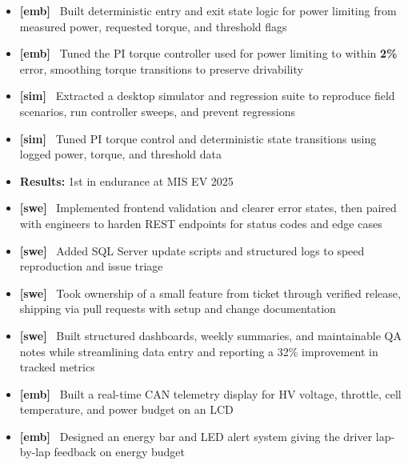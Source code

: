 \documentclass[10pt,letterpaper]{article}
\newcommand{\vtag}[1]{\textbf{[#1]}~}
\begin{document}
\entryspace

\orgline{\spartanracing}
\begin{itemize}
  \item \vtag{emb} Built deterministic entry and exit state logic for power limiting from measured power, requested torque, and threshold flags
  \item \vtag{emb} Tuned the PI torque controller used for power limiting to within \textbf{2\%} error, smoothing torque transitions to preserve drivability
  \item \vtag{sim} Extracted a desktop simulator and regression suite to reproduce field scenarios, run controller sweeps, and prevent regressions
  \item \vtag{sim} Tuned PI torque control and deterministic state transitions using logged power, torque, and threshold data
  \item \textbf{Results:} 1st in endurance at MIS EV 2025
\end{itemize}

\entryspace

\begin{itemize}
  \item \vtag{swe} Implemented frontend validation and clearer error states, then paired with engineers to harden REST endpoints for status codes and edge cases
  \item \vtag{swe} Added SQL Server update scripts and structured logs to speed reproduction and issue triage
  \item \vtag{swe} Took ownership of a small feature from ticket through verified release, shipping via pull requests with setup and change documentation
\end{itemize}

\entryspace

\begin{itemize}
  \item \vtag{swe} Built structured dashboards, weekly summaries, and maintainable QA notes while streamlining data entry and reporting a 32\% improvement in tracked metrics
\end{itemize}


\orgline{\spartanracing}
\begin{itemize}
  \item \vtag{emb} Built a real-time CAN telemetry display for HV voltage, throttle, cell temperature, and power budget on an LCD
  \item \vtag{emb} Designed an energy bar and LED alert system giving the driver lap-by-lap feedback on energy budget
\end{itemize}
\end{document}
